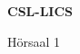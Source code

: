 \documentclass[a4paper]{article}
\begin{document}
\printGenericVSLHeader
\begin{center}
\begin{vsltext}{3cm}{4cm}

   \vspace{0.5cm} 

    \textbf{CSL-LICS} 

    \vspace{1.5cm}

    Hörsaal 1

\end{vsltext}

\end{center}
\end{document}
